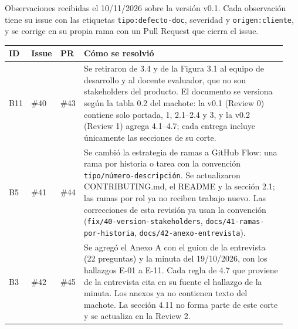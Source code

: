 Observaciones recibidas el 10/11/2026 sobre la versión v0.1. Cada
observación tiene su issue con las etiquetas \texttt{tipo:defecto-doc},
severidad y \texttt{origen:cliente}, y se corrige en su propia rama con
un Pull Request que cierra el issue.

{\small
\begin{longtable}[]{@{}
  >{\raggedright\arraybackslash}p{0.07\linewidth}
  >{\raggedright\arraybackslash}p{0.08\linewidth}
  >{\raggedright\arraybackslash}p{0.07\linewidth}
  >{\raggedright\arraybackslash}p{0.72\linewidth}@{}}
\toprule
\textbf{ID} & \textbf{Issue} & \textbf{PR} & \textbf{Cómo se resolvió} \\
\midrule
\endhead
\bottomrule
\endlastfoot
B11 & \#40 & \#43 & Se retiraron de 3.4 y de la Figura 3.1 al equipo de
desarrollo y al docente evaluador, que no son stakeholders del producto.
El documento se versiona según la tabla 0.2 del machote: la v0.1
(Review 0) contiene solo portada, 1, 2.1--2.4 y 3, y la v0.2 (Review 1)
agrega 4.1--4.7; cada entrega incluye únicamente las secciones de su
corte. \\
B5 & \#41 & \#44 & Se cambió la estrategia de ramas a GitHub Flow: una
rama por historia o tarea con la convención
\texttt{tipo/número-descripción}. Se actualizaron CONTRIBUTING.md, el
README y la sección 2.1; las ramas por rol ya no reciben trabajo nuevo.
Las correcciones de esta revisión ya usan la convención
(\texttt{fix/40-version-stakeholders}, \texttt{docs/41-ramas-por-historia},
\texttt{docs/42-anexo-entrevista}). \\
B3 & \#42 & \#45 & Se agregó el Anexo A con el guion de la entrevista
(22 preguntas) y la minuta del 19/10/2026, con los hallazgos E-01 a E-11.
Cada regla de 4.7 que proviene de la entrevista cita en su fuente el
hallazgo de la minuta. Los anexos ya no contienen texto del machote. La
sección 4.11 no forma parte de este corte y se actualiza en la Review 2. \\
\end{longtable}
}
